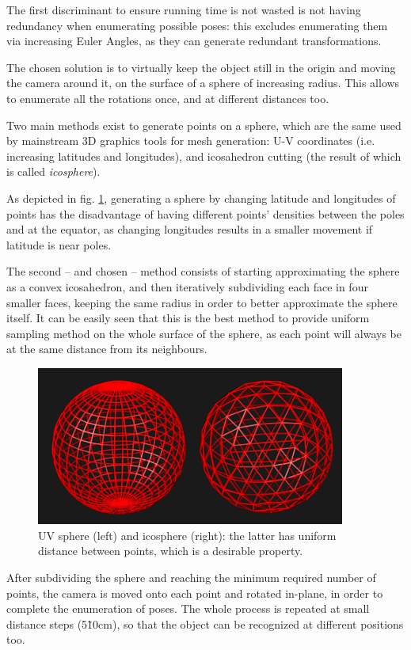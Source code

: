 The first discriminant to ensure running time is not wasted is not having
redundancy when enumerating possible poses: this excludes enumerating them via
increasing Euler Angles, as they can generate redundant transformations.

The chosen solution is to virtually keep the object still in the origin and
moving the camera around it, on the surface of a sphere of increasing radius.
This allows to enumerate all the rotations once, and at different distances too.

Two main methods exist to generate points on a sphere, which are the same
used by mainstream 3D graphics tools for mesh generation: U-V coordinates (i.e.
increasing latitudes and longitudes), and icosahedron cutting (the result of
which is called \emph{icosphere}). 

As depicted in fig. \ref{fig:uvsphere_vs_icosphere}, generating a sphere by changing latitude and longitudes of points has the 
disadvantage of having different points' densities between the poles and at the
equator, as changing longitudes results in a smaller movement if latitude is
near poles. 

The second -- and chosen -- method consists of starting approximating the sphere
as a convex icosahedron, and then iteratively subdividing each face in four
smaller faces, keeping the same radius in order to better approximate the sphere
itself. It can be easily seen that this is the best method to provide uniform
sampling method on the whole surface of the sphere, as each point will always be
at the same distance from its neighbours. 

\begin{figure}[htbp] \label{fig:uvsphere_vs_icosphere}
\centering
\includegraphics[width=4in]{./Graphics/uvsphere_vs_icosphere}
\caption{UV sphere (left) and icosphere (right): the latter has uniform distance
between points, which is a desirable property.}
\end{figure}

After subdividing the sphere and reaching the minimum required number of points,
the camera is moved onto each point and rotated in-plane, in order to complete
the enumeration of poses. The whole process is repeated at small distance steps
(5\~10\unit{cm}), so that the object can be recognized at different positions too.

